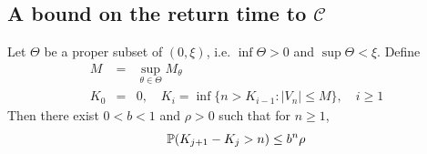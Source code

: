 \subsection[A bound on the return time to C]{
  A bound on the return time to $\mathcal C$
} \label{sec:bound_to_C}
\begin{lemma}
  \label{lemma:2}
  Let $\Theta$ be a proper subset of $(0, \xi)$, i.e.
  $\inf \Theta > 0$ and $\sup \Theta < \xi$. Define
  \begin{eqnarray}
    M &=& \sup_{\theta \in \Theta} M_{\theta} \label{eq:M_def}\\
    K_0 &=& 0, \quad 
    K_i =
    \inf\{n > K_{i-1}: |V_n| \leq M \},\quad i \geq 1
    \label{eq:K_def}
  \end{eqnarray}
  Then there exist $0 < b < 1$ and $\rho > 0$ such that for
  $n \geq 1$,
  \begin{equation}
    \label{eq:koef}
    \P (K_{j+1} - K_j > n)
    \leq
    b^n \rho
  \end{equation}
\end{lemma}
